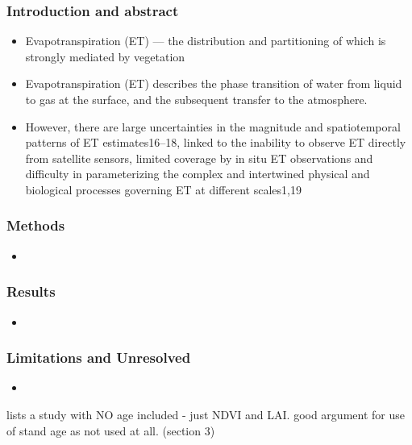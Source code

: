 \documentclass[paper=a4, fontsize=12pt]{scrartcl}
\begin{document}
	\subsubsection{Introduction and abstract}
	\begin{itemize}
		\item Evapotranspiration (ET) — the distribution and partitioning of which is strongly mediated by vegetation
		\item Evapotranspiration (ET) describes the phase transition of water from liquid to gas at the surface, and the subsequent transfer to the atmosphere.
		\item However, there are large uncertainties in the magnitude and spatiotemporal patterns of ET estimates16–18, linked to the inability to observe ET directly from satellite sensors, limited coverage by in situ ET observations and difficulty in parameterizing the complex and intertwined physical and biological processes governing ET at different scales1,19
	\end{itemize}
	
	\subsubsection{Methods}
	\begin{itemize}
		\item  
	\end{itemize}
	
	\subsubsection{Results}
	\begin{itemize}
		\item 
	\end{itemize}
	
	\subsubsection*{Limitations and Unresolved}
	\begin{itemize}
		\item
	\end{itemize}
	
	\newpage \cite{liyew2025review} lists a study with NO age included - just NDVI and LAI. good argument for use of stand age as not used at all. (section 3)
	
	
	\newpage
	
	
	
\end{document}
